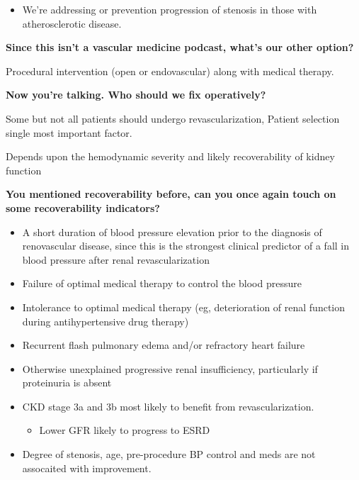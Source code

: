 \documentclass[
]{book}
\providecommand{\tightlist}{%
  \setlength{\itemsep}{0pt}\setlength{\parskip}{0pt}}
\begin{document}
\begin{itemize}
\tightlist
\item
  We're addressing or prevention progression of stenosis in those with
  atherosclerotic disease.
\end{itemize}

\textbf{Since this isn't a vascular medicine podcast, what's our other
option?}

Procedural intervention (open or endovascular) along with medical
therapy.

\textbf{Now you're talking. Who should we fix operatively?}

Some but not all patients should undergo revascularization, Patient
selection single most important factor.

Depends upon the hemodynamic severity and likely recoverability of
kidney function

\textbf{You mentioned recoverability before, can you once again touch on some
recoverability indicators?}

\begin{itemize}
\item
  A short duration of blood pressure elevation prior to the diagnosis
  of renovascular disease, since this is the strongest clinical
  predictor of a fall in blood pressure after renal revascularization
\item
  Failure of optimal medical therapy to control the blood pressure
\item
  Intolerance to optimal medical therapy (eg, deterioration of renal
  function during antihypertensive drug therapy)
\item
  Recurrent flash pulmonary edema and/or refractory heart failure
\item
  Otherwise unexplained progressive renal insufficiency, particularly
  if proteinuria is absent
\item
  CKD stage 3a and 3b most likely to benefit from revascularization.
  \citep{singerImpactBaselineRenal2009}

  \begin{itemize}
  \tightlist
  \item
    Lower GFR likely to progress to ESRD
  \end{itemize}
\item
  Degree of stenosis, age, pre-procedure BP control and meds are not
  assocaited with improvement.
  \citep{textorPercutaneousRevascularizationIschemic2013}
\end{itemize}
\end{document}
